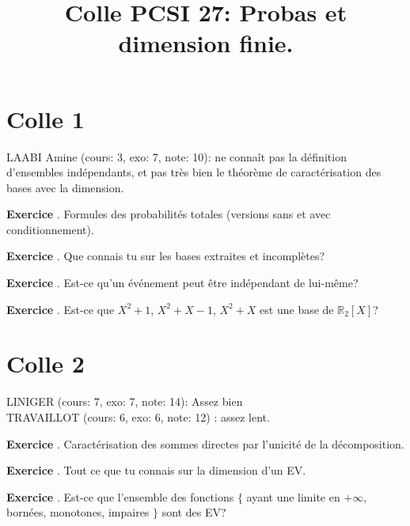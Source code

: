\documentclass[10pt,a4paper]{article}
\title{Colle PCSI 27: Probas et dimension finie.}
\newcounter{question}
\newcounter{exo}
\newenvironment{exo}{\vspace{0.5cm}\setcounter{question}{0}\addtocounter{exo}{1} \noindent \textbf{Exercice \theexo}. \normalsize }{\par}
\begin{document}
	\maketitle
	
	
	\section*{Colle 1}
	\setcounter{exo}{0}
	LAABI Amine (cours: 3, exo: 7, note: 10): ne connaît pas la définition d'ensembles indépendants, et pas très bien le théorème de caractérisation des bases avec la dimension. \\
	
	\begin{exo}
		  Formules des probabilités totales (versions sans et avec conditionnement).
	\end{exo}

	\begin{exo}
		Que connais tu sur les bases extraites et incomplètes?
	\end{exo}

	\begin{exo}
		Est-ce qu'un événement peut être indépendant de lui-même?
	\end{exo}	

	\begin{exo}
		Est-ce que $X^2 + 1$, $X^2+ X - 1$, $X^2 + X$ est une base de $\mathbb{R}_2[X]$?
	\end{exo}	
	
	\section*{Colle 2}
	\setcounter{exo}{0}
	LINIGER (cours: 7, exo: 7, note: 14): Assez bien\\
	TRAVAILLOT (cours: 6, exo: 6, note: 12) : assez lent.\\
	
	\begin{exo}
		  Caractérisation des sommes directes par l'unicité de la décomposition.
	\end{exo}		

	\begin{exo}
		Tout ce que tu connais sur la dimension d'un EV.
	\end{exo}

	\begin{exo}
		Est-ce que l'ensemble des fonctions $\lbrace$ ayant une limite en $+ \infty$, bornées, monotones, impaires $\rbrace$ sont des EV? 
	\end{exo}	
\end{document}
